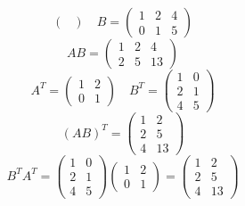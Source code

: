 \documentclass[a4paper]{article}
\theoremstyle{break}
\theoremstyle{break}
\theoremstyle{break}
\theoremstyle{break}
\begin{document}
\begin{itemize}
\begin{figure}[H]
\begin{example}
\[\begin{pmatrix}
          \end{pmatrix} 
          \quad
          B = \begin{pmatrix} 
            1 & 2 & 4\\
            0 & 1 & 5
          \end{pmatrix} 
        \] 
        \[
          AB = \begin{pmatrix} 
            1 & 2 & 4\\
            2 & 5 & 13
          \end{pmatrix} 
        \] 
        \[
          A^T = \begin{pmatrix}
            1 & 2\\
            0 & 1
          \end{pmatrix} 
          \quad
          B^T = \begin{pmatrix} 
            1 & 0\\
            2 & 1\\
            4 & 5
          \end{pmatrix} 
        \] 
        \[
          (AB)^T = \begin{pmatrix} 
            1 & 2\\
            2 & 5\\
            4 & 13
          \end{pmatrix} 
        \] 
        \[
          B^T A^T = \begin{pmatrix} 
            1 & 0\\
            2 & 1\\
            4 & 5 
          \end{pmatrix}
          \begin{pmatrix} 
            1 & 2\\
            0 & 1
          \end{pmatrix}
          =
          \begin{pmatrix} 
            1 & 2\\
            2 & 5\\
            4 & 13
          \end{pmatrix}
        \] 
      \end{example}
    \end{figure}


\end{itemize}
\end{document}
